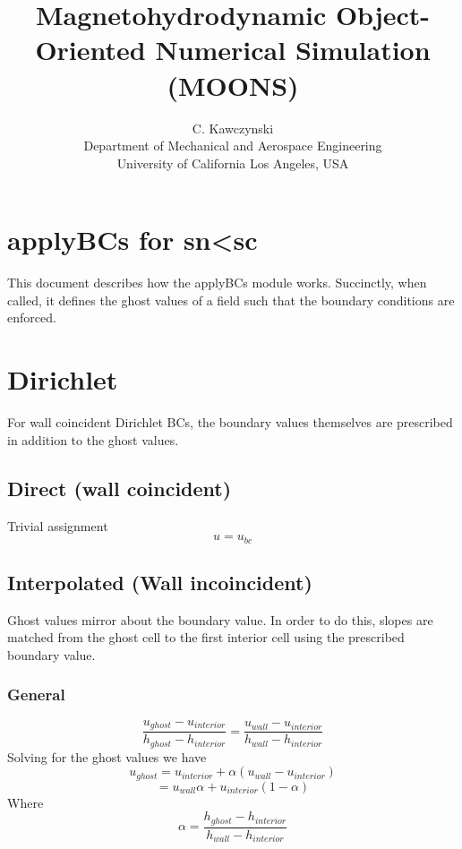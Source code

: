\documentclass[11pt]{article}
\begin{document}
\doublespacing
\title{Magnetohydrodynamic Object-Oriented Numerical Simulation (MOONS)}
\author{C. Kawczynski \\
Department of Mechanical and Aerospace Engineering \\
University of California Los Angeles, USA\\
}
\maketitle

\section{applyBCs for sn<sc}

This document describes how the applyBCs module works. Succinctly, when called, it defines the ghost values of a field such that the boundary conditions are enforced.

\section{Dirichlet}
For wall coincident Dirichlet BCs, the boundary values themselves are prescribed in addition to the ghost values.

\subsection{Direct (wall coincident)}
Trivial assignment
\begin{equation}
u = u_{bc}
\end{equation}

\subsection{Interpolated (Wall incoincident)}
Ghost values mirror about the boundary value. In order to do this, slopes are matched from the ghost cell to the first interior cell using the prescribed boundary value.

\subsubsection{General}
\begin{equation}
	\frac{u_{ghost}-u_{interior}}{h_{ghost}-h_{interior}}
	=
	\frac{u_{wall}-u_{interior}}{h_{wall}-h_{interior}}
\end{equation}
Solving for the ghost values we have
\begin{equation}
	u_{ghost}
	=
	u_{interior} + \alpha (u_{wall}-u_{interior})
\end{equation}
\begin{equation}
	=
	u_{wall}\alpha + u_{interior}(1-\alpha)
\end{equation}
Where
\begin{equation}
	\alpha = \frac{h_{ghost}-h_{interior}}{h_{wall}-h_{interior}}
\end{equation}
\end{document}
